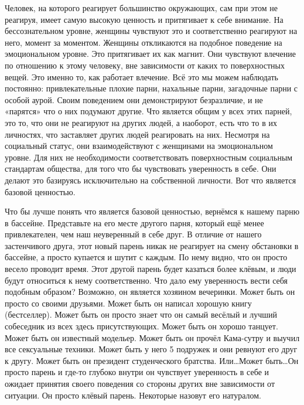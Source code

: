 Человек, на которого реагирует большинство окружающих, сам при этом не реагируя, имеет самую высокую ценность и притягивает к себе внимание. На бессознательном уровне, женщины чувствуют это и соответственно реагируют на него, момент за моментом. Женщины откликаются на подобное поведение на эмоциональном уровне. Это притягивает их как магнит. Они чувствуют влечение по отношению к этому человеку, вне зависимости от каких то поверхностных вещей. Это именно то, как работает влечение. Всё это мы можем наблюдать постоянно: привлекательные плохие парни, нахальные парни, загадочные парни с особой аурой. Своим поведением они демонстрируют безразличие, и не «парятся» что о них подумают другие. Что является общим у всех этих парней, это то, что они не реагируют на других людей, а наоборот, есть что то в их личностях, что заставляет других людей реагировать на них. Несмотря на социальный статус, они взаимодействуют с женщинами на эмоциональном уровне. Для них не необходимости соответствовать поверхностным социальным стандартам общества, для того что бы чувствовать уверенность в себе. Они делают это базируясь исключительно на собственной личности. Вот что является базовой ценностью.

Что бы лучше понять что является базовой ценностью, вернёмся к нашему парню в бассейне. Представьте на его месте другого парня, который ещё менее привлекателен, чем наш неуверенный в себе друг. В отличие от нашего застенчивого друга, этот новый парень никак не реагирует на смену обстановки в бассейне, а просто купается и шутит с каждым. По нему видно, что он просто весело проводит время. Этот другой парень будет казаться более клёвым, и люди будут относиться к нему соответственно. Что дало ему уверенность вести себя подобным образом? Возможно, он является хозяином вечеринки. Может быть он просто со своими друзьями. Может быть он написал хорошую книгу (бестселлер). Может быть он просто знает что он самый весёлый и лучший собеседник из всех здесь присутствующих. Может быть он хорошо танцует. Может быть он известный модельер. Может быть он прочёл Кама-сутру и выучил все сексуальные техники. Может быть у него 5 подружек и они ревнуют его друг к другу. Может быть он президент студенческого братства. Или\ldots Может быть\ldots Он просто парень и где-то глубоко внутри он чувствует уверенность в себе и ожидает принятия своего поведения со стороны других вне зависимости от ситуации. Он просто клёвый парень. Некоторые назовут его натуралом.


